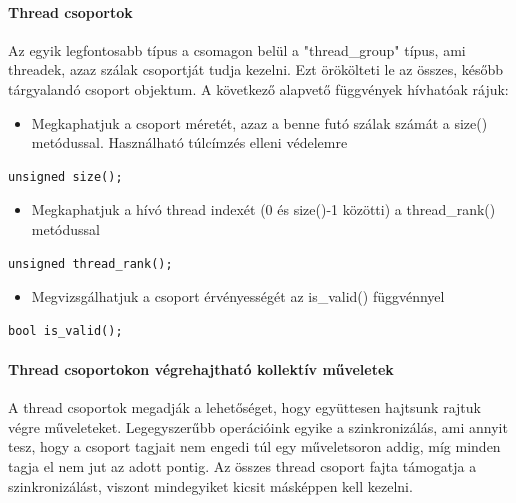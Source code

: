 \paragraph{Thread csoportok}
Az egyik legfontosabb típus a csomagon belül a "thread\_group" típus, ami threadek, azaz szálak csoportját tudja kezelni. Ezt örökölteti le az összes, később tárgyalandó csoport objektum. A következő alapvető függvények hívhatóak rájuk:

\begin{itemize}
	\item Megkaphatjuk a csoport méretét, azaz a benne futó szálak számát a size() metódussal. Használható túlcímzés elleni védelemre
\end{itemize}	

\begin{lstlisting}[style=CStyle]
	unsigned size();
\end{lstlisting}

\begin{itemize}
	\item Megkaphatjuk a hívó thread indexét (0 és size()-1 közötti) a thread\_rank() metódussal
\end{itemize}	

\begin{lstlisting}[style=CStyle]
	unsigned thread_rank();
\end{lstlisting}

\begin{itemize}	
	\item Megvizsgálhatjuk a csoport érvényességét az is\_valid() függvénnyel
\end{itemize}

\begin{lstlisting}[style=CStyle]
	bool is_valid();
\end{lstlisting}

\paragraph{Thread csoportokon végrehajtható kollektív műveletek}

A thread csoportok megadják a lehetőséget, hogy együttesen hajtsunk rajtuk végre műveleteket. Legegyszerűbb operációink egyike a szinkronizálás, ami annyit tesz, hogy a csoport tagjait nem engedi túl egy műveletsoron addig, míg minden tagja el nem jut az adott pontig. Az összes thread csoport fajta támogatja a szinkronizálást, viszont mindegyiket kicsit másképpen kell kezelni.

